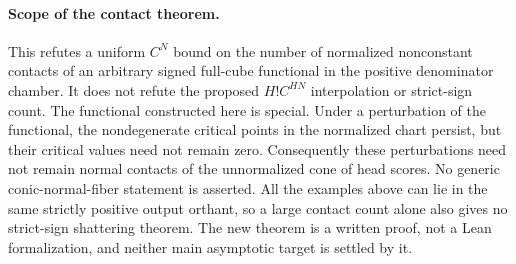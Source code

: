 \documentclass[11pt]{article}
\begin{document}
\paragraph{Scope of the contact theorem.}
This refutes a uniform $C^N$ bound on the number of normalized
nonconstant contacts of an arbitrary signed full-cube functional in
the positive denominator chamber. It does not refute the proposed
$H!C^{HN}$ interpolation or strict-sign count. The functional constructed
here is special. Under a perturbation of the functional, the
nondegenerate critical points in the normalized chart persist, but
their critical values need not remain zero. Consequently these
perturbations need not remain normal contacts of the unnormalized cone
of head scores. No generic conic-normal-fiber statement is asserted.
All the examples above can lie in the same strictly positive output
orthant, so a large contact count alone also gives no strict-sign
shattering theorem. The new theorem is a written proof, not a Lean
formalization, and neither main asymptotic target is settled by it.
\end{document}
